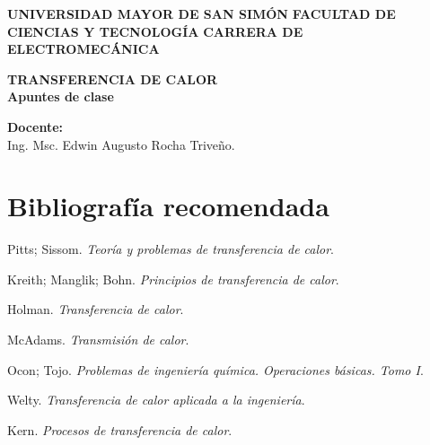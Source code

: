 \documentclass[letter,twosides,11pt]{book}
\begin{document}
\begin{titlepage}
    \begin{center}
        \begin{minipage}[]{.55\linewidth}
            \centering
            \large{\textbf{UNIVERSIDAD MAYOR DE SAN SIMÓN}} \newline
            \large{\textbf{FACULTAD DE CIENCIAS Y TECNOLOGÍA}} \newline
            \large{\textbf{CARRERA DE ELECTROMECÁNICA}} \newline
        \end{minipage}

        \vspace*{8.4cm}
        {\Large \textbf{TRANSFERENCIA DE CALOR}}\\
        \vspace*{0.3cm}
        {\Large \textbf{Apuntes de clase}}\\
    \end{center}

    \vspace*{8.4cm}
    \leftskip=7.95cm
    \noindent
    \textbf{Docente:}\\
    Ing. Msc. Edwin Augusto Rocha Triveño.\\
\end{titlepage}

\clearpage
\setcounter{page}{1}

\tableofcontents
\newpage

\section*{Bibliografía recomendada}
\begin{enumerate}[{label=[\arabic{*}]}]
\item Pitts; Sissom. \emph{Teoría y problemas de transferencia de calor}.
\item Kreith; Manglik; Bohn. \emph{Principios de transferencia de calor}.
\item Holman. \emph{Transferencia de calor}.
\item McAdams. \emph{Transmisión de calor}.
\item Ocon; Tojo. \emph{Problemas de ingeniería química. Operaciones básicas. Tomo I}.
\item Welty. \emph{Transferencia de calor aplicada a la ingeniería}.
\item Kern. \emph{Procesos de transferencia de calor}.
\end{enumerate}

%
%
%
%
%



\end{document}
